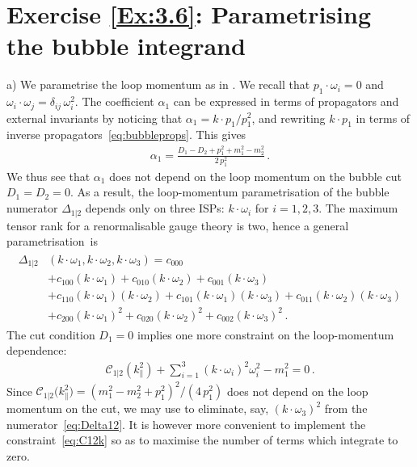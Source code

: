 \section*{Exercise \ref{Ex:3.6}: Parametrising the bubble integrand}
\label{Sol:3.6}
a) We parametrise the loop momentum as in . We recall that $p_1 \cdot \omega_i = 0$ and $\omega_i \cdot \omega_j = \delta_{ij} \, \omega_i^2$. The coefficient $\alpha_1$ can be expressed in terms of propagators and external invariants by noticing that $\alpha_1 = k\cdot p_1/p_1^2$, and rewriting $k\cdot p_1$ in terms of inverse propagators~\eqref{eq:bubbleprops}. This gives
\begin{align} \label{eq:alpha1toD}
\alpha_1 = \frac{D_1-D_2 +p_1^2 + m_1^2-m_2^2}{2 \, p_1^2}\,.
\end{align}
We thus see that $\alpha_1$ does not depend on the loop momentum on the bubble cut $D_1=D_2=0$. As a result, the loop-momentum parametrisation of the bubble numerator $\Delta_{1|2}$ depends only on three ISPs: $k\cdot \omega_i$ for $i=1,2,3$. The maximum tensor rank for a renormalisable gauge theory is two, hence a general parametrisation~is
%
\begin{align} \label{eq:Delta12}
\begin{aligned}
  \Delta_{1|2}&(k \cdot \omega_1, k \cdot \omega_2, k \cdot \omega_3) = c_{000} \\
 & + c_{100} (k \cdot \omega_1) 
  + c_{010} (k \cdot \omega_2) + c_{001} (k \cdot \omega_3)  \\
 & + c_{110} (k \cdot \omega_1) (k \cdot \omega_2) 
  + c_{101} (k \cdot \omega_1) (k \cdot \omega_3) 
  + c_{011} (k \cdot \omega_2) (k \cdot \omega_3) \\
  & + c_{200} (k \cdot \omega_1)^2 
  + c_{020} (k \cdot \omega_2)^2 
  + c_{002} (k \cdot \omega_3)^2  \,.
\end{aligned}
\end{align}
%
The cut condition $D_1=0$ implies one more constraint on the loop-momentum dependence:
\begin{align} \label{eq:C12k}
\mathcal{C}_{1|2}\left(k_{\parallel}^2\right) + \sum_{i=1}^3 (k\cdot \omega_i)^2 \omega_i^2 -m_1^2 = 0 \,.
\end{align}
Since $\mathcal{C}_{1|2}\bigl(k_{\parallel}^2\bigl) = (m_1^2 - m_2^2 + p_1^2)^2/(4 \, p_1^2)$ does not depend on the loop momentum on the cut, we may use  to eliminate, say, $(k\cdot \omega_3)^2$ from the numerator~\eqref{eq:Delta12}. It is however more convenient to implement the constraint~\eqref{eq:C12k} so as to maximise the number of terms which integrate to zero.
